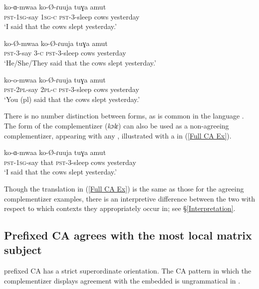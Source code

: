 \documentclass[output=paper
,newtxmath
,modfonts
,nonflat]{langsci/langscibook}
\begin{document}
\ea \label{Agreeing C Paradigm}
\begin{xlist} 

\ex
\gll	ko-ɑ-mwaa  ko-\O-ɾuuja tuɣa amut \\
\textsc{pst}-1\textsc{sg}-say 1\textsc{sg-c} \textsc{pst}-3-sleep cows yesterday \\
\glt `I said that the cows slept yesterday.'

\ex  \label{Agreeing 3rd}
\gll ko-\O-mwaa  ko-\O-ɾuuja tuɣa amut \\
\textsc{pst}-3-say 3-\textsc{c} \textsc{pst}-3-sleep cows yesterday \\
\glt `He/She/They said that the cows slept yesterday.'
    	
\ex
\gll ko-o-mwaa  ko-\O-ɾuuja tuɣa amut \\
\textsc{pst}-2\textsc{pl}-say 2\textsc{pl-c} \textsc{pst}-3-sleep cows yesterday \\
\glt `You (pl) said that the cows slept yesterday.'

\end{xlist}
\z

\noindent There is no number distinction between  forms, as is common in the language \citep[see][]{Jake:1979, Toweett:1979}. The  form of the complementizer (\textit{kɔlɛ}) can also be used as a non-agreeing complementizer, appearing with any , illustrated with a   in (\ref{Full CA Ex}). 

\ea \label{Full CA Ex}
\gll	ko-ɑ-mwaa  ko-\O-ɾuuja tuɣa amut \\
\textsc{pst}-1\textsc{sg}-say that \textsc{pst}-3-sleep cows yesterday \\
\glt `I said that the cows slept yesterday.'

\z

\noindent Though the translation in (\ref{Full CA Ex}) is the same as those for the agreeing complementizer examples, there is an interpretive difference between the two with respect to which contexts they appropriately occur in; see \S \ref{Interpretation}.

\subsection{Prefixed CA agrees with the most local matrix subject} 

 prefixed CA has a strict superordinate  orientation. The  CA pattern \textendash in which the complementizer displays agreement with the embedded  \textendash is ungrammatical in . 
\end{document}

